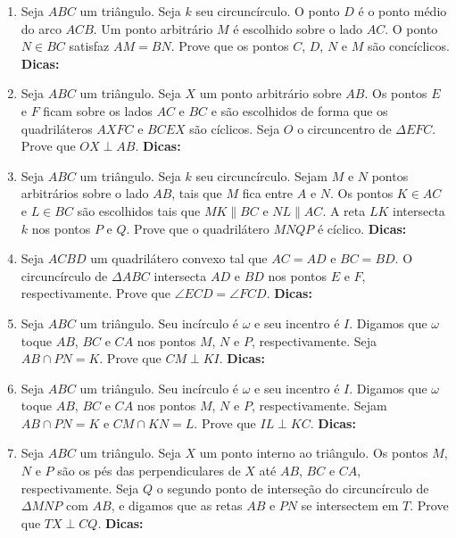 \documentclass{article}
\newcommand{\dica}{\textbf{Dicas:}}
\newcommand{\iniTri}{Seja $ABC$ um triângulo}
\begin{document}
\begin{multicols}{2}
\begin{enumerate}
    \item \iniTri. Seja $k$ seu circuncírculo. O ponto $D$ é o ponto médio do arco $ACB$. Um ponto arbitrário $M$ é escolhido sobre o lado $AC$. O ponto $N\in BC$ satisfaz $AM=BN$. Prove que os pontos $C$, $D$, $N$ e $M$ são concíclicos. \dica %
    
    \item \iniTri. Seja $X$ um ponto arbitrário sobre $AB$. Os pontos $E$ e $F$ ficam sobre os lados $AC$ e $BC$ e são escolhidos de forma que os quadriláteros $AXFC$ e $BCEX$ são cíclicos. Seja $O$ o circuncentro de $\Delta EFC$. Prove que $OX\perp AB$. \dica %
    
    \item \iniTri. Seja $k$ seu circuncírculo. Sejam $M$ e $N$ pontos arbitrários sobre o lado $AB$, tais que $M$ fica entre $A$ e $N$. Os pontos $K\in AC$ e $L\in BC$ são escolhidos tais que $MK\parallel BC$ e $NL\parallel AC$. A reta $LK$ intersecta $k$ nos pontos $P$ e $Q$. Prove que o quadrilátero $MNQP$ é cíclico. \dica %
    
    \item Seja $ACBD$ um quadrilátero convexo tal que $AC=AD$ e $BC=BD$. O circuncírculo de $\Delta ABC$ intersecta $AD$ e $BD$ nos pontos $E$ e $F$, respectivamente. Prove que $\angle ECD=\angle FCD$. \dica %
    
    \item \iniTri. Seu incírculo é $\omega$ e seu incentro é $I$. Digamos que $\omega$ toque $AB$, $BC$ e $CA$ nos pontos $M$, $N$ e $P$, respectivamente. Seja $AB\cap PN=K$. Prove que $CM\perp KI$. \dica %
    
    \item \iniTri. Seu incírculo é $\omega$ e seu incentro é $I$. Digamos que $\omega$ toque $AB$, $BC$ e $CA$ nos pontos $M$, $N$ e $P$, respectivamente. Sejam $AB\cap PN=K$ e $CM\cap KN=L$. Prove que $IL\perp KC$. \dica %
    
    \item \iniTri. Seja $X$ um ponto interno ao triângulo. Os pontos $M$, $N$ e $P$ são os pés das perpendiculares de $X$ até $AB$, $BC$ e $CA$, respectivamente. Seja $Q$ o segundo ponto de interseção do circuncírculo de $\Delta MNP$ com $AB$, e digamos que as retas $AB$ e $PN$ se intersectem em $T$. Prove que $TX\perp CQ$. \dica %
    

\end{enumerate}
\end{multicols}
\end{document}
